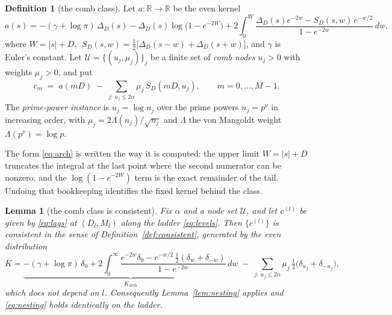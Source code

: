 \documentclass[11pt,a4paper]{article}
\theoremstyle{plain}
\newtheorem{lemma}[theorem]{Lemma}
\theoremstyle{definition}
\newtheorem{definition}[theorem]{Definition}
\newcommand{\R}{\mathbb{R}}
\begin{document}
\begin{definition}[the comb class]
\label{def:class}
Let $a:\R\to\R$ be the even kernel
\begin{equation}
\label{eq:arch}
  a(s)=-(\gamma+\log\pi)\,\Delta_{D}(s)
      -\Delta_{D}(s)\log\!\bigl(1-e^{-2W}\bigr)
      +2\int_{0}^{W}
        \frac{\Delta_{D}(s)e^{-2w}-S_{D}(s,w)\,e^{-w/2}}{1-e^{-2w}}\,dw,
\end{equation}
where $W=|s|+D$, $\;S_{D}(s,w)=\tfrac12\bigl[\Delta_{D}(s-w)+\Delta_{D}(s+w)\bigr]$,
and $\gamma$ is Euler's constant. Let $\mathcal U=\{(u_{j},\mu_{j})\}_{j}$ be a
finite set of \emph{comb nodes} $u_{j}>0$ with weights $\mu_{j}>0$, and put
\begin{equation}
\label{eq:lags}
  c_{m} \;=\; a(mD)\;-\;\sum_{j:\,u_{j}\le 2\alpha}\mu_{j}\,S_{D}(mD,u_{j}),
  \qquad m=0,\dots,M-1 .
\end{equation}
The \emph{prime-power instance} is $u_{j}=\log n_{j}$ over the prime powers
$n_{j}=p^{\nu}$ in increasing order, with $\mu_{j}=2\Lambda(n_{j})/\sqrt{n_{j}}$ and
$\Lambda$ the von Mangoldt weight $\Lambda(p^{\nu})=\log p$.
\end{definition}

The form \eqref{eq:arch} is written the way it is computed: the upper limit $W=|s|+D$
truncates the integral at the last point where the second numerator can be nonzero,
and the $\log(1-e^{-2W})$ term is the exact remainder of the tail. Undoing that
bookkeeping identifies the fixed kernel behind the class.

\begin{lemma}[the comb class is consistent]
\label{lem:classconsistent}
Fix $\alpha$ and a node set $\mathcal U$, and let $c^{(l)}$ be given by
\eqref{eq:lags} at $(D_{l},M_{l})$ along the ladder \eqref{eq:levels}. Then
$\{c^{(l)}\}$ is consistent in the sense of Definition~\ref{def:consistent}, generated
by the even distribution
\begin{equation}
\label{eq:K}
  K=\underbrace{-(\gamma+\log\pi)\,\delta_{0}
    +2\int_{0}^{\infty}\frac{e^{-2w}\delta_{0}
       -e^{-w/2}\,\tfrac12(\delta_{w}+\delta_{-w})}{1-e^{-2w}}\,dw}_{K_{\mathrm{arch}}}
  \;-\;\sum_{j:\,u_{j}\le2\alpha}\mu_{j}\,
       \tfrac12\bigl(\delta_{u_{j}}+\delta_{-u_{j}}\bigr),
\end{equation}
which does not depend on $l$. Consequently Lemma~\ref{lem:nesting} applies and
\eqref{eq:nesting} holds identically on the ladder.
\end{lemma}
\end{document}
